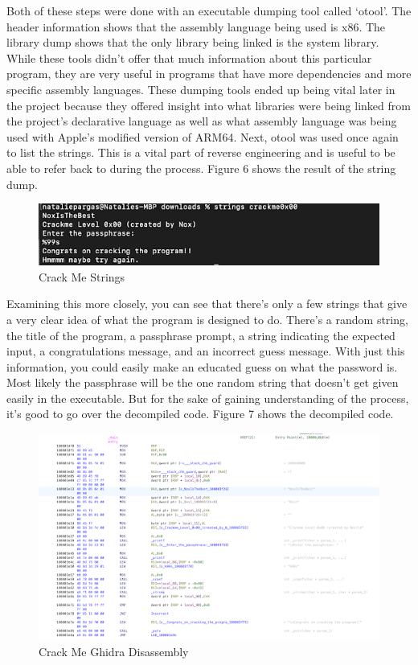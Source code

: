 Both of these steps were done with an executable dumping tool called ‘otool’. 
The header information shows that the assembly language being used is x86. 
The library dump shows that the only library being linked is the system library. 
While these tools didn’t offer that much information about this particular program, they are very useful in programs that have more dependencies and more specific assembly languages. 
These dumping tools ended up being vital later in the project because they offered insight into what libraries were being linked from the project's declarative language as well as what assembly language was being used with Apple’s modified version of ARM64. 
Next, otool was used once again to list the strings. 
This is a vital part of reverse engineering and is useful to be able to refer back to during the process. 
Figure 6 shows the result of the string dump.

\begin{figure}[h]
\caption{Crack Me Strings}
\includegraphics{crackmestrings.png}
\end{figure}
  
Examining this more closely, you can see that there’s only a few strings that give a very clear idea of what the program is designed to do. 
There’s a random string, the title of the program, a passphrase prompt, a string indicating the expected input, a congratulations message, and an incorrect guess message. 
With just this information, you could easily make an educated guess on what the password is. 
Most likely the passphrase will be the one random string that doesn’t get given easily in the executable. 
But for the sake of gaining understanding of the process, it’s good to go over the decompiled code. 
Figure 7 shows the decompiled code.
  
\begin{figure}[h]
\caption{Crack Me Ghidra Disassembly}
\includegraphics{crackmeghidra.png}
\end{figure}
  
